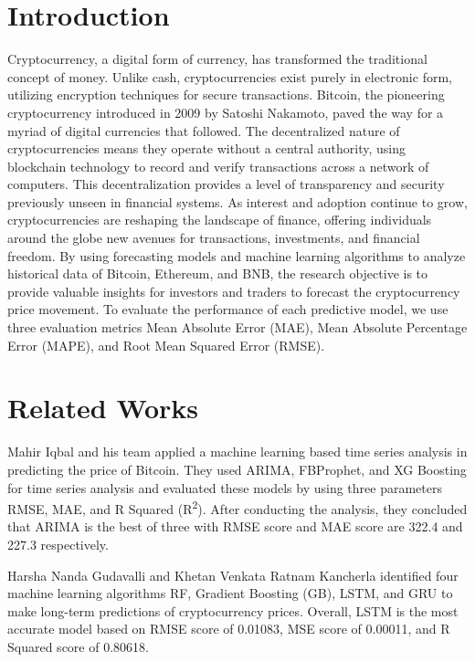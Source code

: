 \documentclass{ieeeojies}
\begin{document}
\section{Introduction}
\label{sec:introduction}
Cryptocurrency, a digital form of currency, has transformed the traditional concept of money. Unlike cash, cryptocurrencies exist purely in electronic form, utilizing encryption techniques for secure transactions. Bitcoin, the pioneering cryptocurrency introduced in 2009 by Satoshi Nakamoto, paved the way for a myriad of digital currencies that followed. The decentralized nature of cryptocurrencies means they operate without a central authority, using blockchain technology to record and verify transactions across a network of computers. This decentralization provides a level of transparency and security previously unseen in financial systems. As interest and adoption continue to grow, cryptocurrencies are reshaping the landscape of finance, offering individuals around the globe new avenues for transactions, investments, and financial freedom. \newline
By using forecasting models and machine learning algorithms to analyze historical data of Bitcoin, Ethereum, and BNB, the research objective is to provide valuable insights for investors and traders to forecast the cryptocurrency price movement. To evaluate the performance of each predictive model, we use three evaluation metrics Mean Absolute Error (MAE), Mean Absolute Percentage Error (MAPE), and Root Mean Squared Error (RMSE).
\section{Related Works}
Mahir Iqbal and his team \cite{b1} applied a machine learning based time series analysis in predicting the price of Bitcoin. They used ARIMA, FBProphet, and XG Boosting for time series analysis and evaluated these models by using three parameters RMSE, MAE, and R Squared (R\textsuperscript{2}). After conducting the analysis, they concluded that ARIMA is the best of three with RMSE score and MAE score are 322.4 and 227.3 respectively.\newline

Harsha Nanda Gudavalli and Khetan Venkata Ratnam Kancherla \cite{b2} identified four machine learning algorithms RF, Gradient Boosting (GB), LSTM, and GRU to make long-term predictions of cryptocurrency prices. Overall, LSTM is the most accurate model based on RMSE score of 0.01083, MSE score of 0.00011, and R Squared score of 0.80618.\newline
\end{document}
